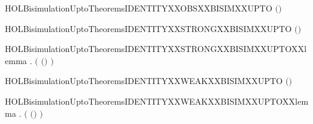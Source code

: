 \newcommand{\HOLBisimulationUptoTheoremsCONVERSEXXWEAKXXBISIMXXUPTOXXlemmaYY}{\UseVerbatim{HOLBisimulationUptoTheoremsCONVERSEXXWEAKXXBISIMXXUPTOXXlemmaYY}}
\begin{SaveVerbatim}{HOLBisimulationUptoTheoremsIDENTITYXXOBSXXBISIMXXUPTO}
\HOLTokenTurnstile{}  \ensuremath{(}\HOLSymConst{\ensuremath{=}}\ensuremath{)}
\end{SaveVerbatim}
\newcommand{\HOLBisimulationUptoTheoremsIDENTITYXXOBSXXBISIMXXUPTO}{\UseVerbatim{HOLBisimulationUptoTheoremsIDENTITYXXOBSXXBISIMXXUPTO}}
\begin{SaveVerbatim}{HOLBisimulationUptoTheoremsIDENTITYXXSTRONGXXBISIMXXUPTO}
\HOLTokenTurnstile{}  \ensuremath{(}\HOLSymConst{\ensuremath{=}}\ensuremath{)}
\end{SaveVerbatim}
\newcommand{\HOLBisimulationUptoTheoremsIDENTITYXXSTRONGXXBISIMXXUPTO}{\UseVerbatim{HOLBisimulationUptoTheoremsIDENTITYXXSTRONGXXBISIMXXUPTO}}
\begin{SaveVerbatim}{HOLBisimulationUptoTheoremsIDENTITYXXSTRONGXXBISIMXXUPTOXXlemma}
\HOLTokenTurnstile{} \HOLSymConst{\HOLTokenForall{}}. \ensuremath{(}  \ensuremath{(}\HOLSymConst{\ensuremath{=}}\ensuremath{)}  \ensuremath{)}  
\end{SaveVerbatim}
\newcommand{\HOLBisimulationUptoTheoremsIDENTITYXXSTRONGXXBISIMXXUPTOXXlemma}{\UseVerbatim{HOLBisimulationUptoTheoremsIDENTITYXXSTRONGXXBISIMXXUPTOXXlemma}}
\begin{SaveVerbatim}{HOLBisimulationUptoTheoremsIDENTITYXXWEAKXXBISIMXXUPTO}
\HOLTokenTurnstile{}  \ensuremath{(}\HOLSymConst{\ensuremath{=}}\ensuremath{)}
\end{SaveVerbatim}
\newcommand{\HOLBisimulationUptoTheoremsIDENTITYXXWEAKXXBISIMXXUPTO}{\UseVerbatim{HOLBisimulationUptoTheoremsIDENTITYXXWEAKXXBISIMXXUPTO}}
\begin{SaveVerbatim}{HOLBisimulationUptoTheoremsIDENTITYXXWEAKXXBISIMXXUPTOXXlemma}
\HOLTokenTurnstile{} \HOLSymConst{\HOLTokenForall{}}. \ensuremath{(}  \ensuremath{(}\HOLSymConst{\ensuremath{=}}\ensuremath{)}  \ensuremath{)}  
\end{SaveVerbatim}
\newcommand{\HOLBisimulationUptoTheoremsIDENTITYXXWEAKXXBISIMXXUPTOXXlemma}{\UseVerbatim{HOLBisimulationUptoTheoremsIDENTITYXXWEAKXXBISIMXXUPTOXXlemma}}
